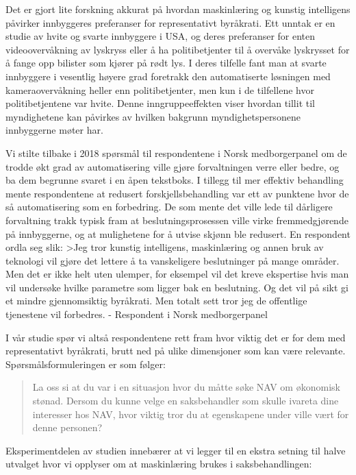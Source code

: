 \documentclass[
]{book}
\begin{document}
Det er gjort lite forskning akkurat på hvordan maskinlæring og kunstig intelligens påvirker innbyggeres preferanser for representativt byråkrati.
Ett unntak er en studie av hvite og svarte innbyggere i USA, og deres preferanser for enten videoovervåkning av lyskryss eller å ha politibetjenter til å overvåke lyskrysset for å fange opp bilister som kjører på rødt lys.
I deres tilfelle fant man at svarte innbyggere i vesentlig høyere grad foretrakk den automatiserte løsningen med kameraovervåkning heller enn politibetjenter, men kun i de tilfellene hvor politibetjentene var hvite.
Denne inngruppeeffekten viser hvordan tillit til myndighetene kan påvirkes av hvilken bakgrunn myndighetspersonene innbyggerne møter har.

Vi stilte tilbake i 2018 spørsmål til respondentene i Norsk medborgerpanel om de trodde økt grad av automatisering ville gjøre forvaltningen verre eller bedre, og ba dem begrunne svaret i en åpen tekstboks.
I tillegg til mer effektiv behandling mente respondentene at redusert forskjellsbehandling var ett av punktene hvor de så automatisering som en forbedring.
De som mente det ville lede til dårligere forvaltning trakk typisk fram at beslutningsprosessen ville virke fremmedgjørende på innbyggerne, og at mulighetene for å utvise skjønn ble redusert.
En respondent ordla seg slik:
\textgreater Jeg tror kunstig intelligens, maskinlæring og annen bruk av teknologi vil gjøre det lettere å ta vanskeligere beslutninger på mange områder.
Men det er ikke helt uten ulemper, for eksempel vil det kreve ekspertise hvis man vil undersøke hvilke parametre som ligger bak en beslutning.
Og det vil på sikt gi et mindre gjennomsiktig byråkrati.
Men totalt sett tror jeg de offentlige tjenestene vil forbedres.
- Respondent i Norsk medborgerpanel

I vår studie spør vi altså respondentene rett fram hvor viktig det er for dem med representativt byråkrati, brutt ned på ulike dimensjoner som kan være relevante.
Spørsmålsformuleringen er som følger:

\begin{quote}
La oss si at du var i en situasjon hvor du måtte søke NAV om økonomisk stønad. Dersom du kunne velge en saksbehandler som skulle ivareta dine interesser hos NAV, hvor viktig tror du at egenskapene under ville vært for denne personen?
\end{quote}

Eksperimentdelen av studien innebærer at vi legger til en ekstra setning til halve utvalget hvor vi opplyser om at maskinlæring brukes i saksbehandlingen:
\end{document}
